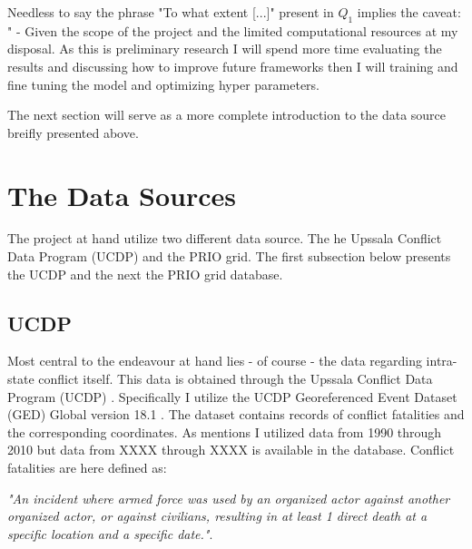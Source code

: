 \documentclass[a4paper]{article}
\begin{document}

Needless to say the phrase "To what extent [...]" present in $Q_1$ implies the caveat: " - Given the scope of the project and the limited computational resources at my disposal. As this is preliminary research I will spend more time evaluating the results and discussing how to improve future frameworks then I will training and fine tuning the model and optimizing hyper parameters.\par 

The next section will serve as a more complete introduction to the data source breifly presented above.\par

\section{The Data Sources} %

The project at hand utilize two different data source. The he Upssala Conflict Data Program (UCDP) \citep{Sundberg_2013, Croicu_Sundberg_2017} and the PRIO grid\citep{Tollefsen_2012}. The first subsection below presents the UCDP and the next the PRIO grid database.\par

\subsection{UCDP}

Most central to the endeavour at hand lies - of course - the data regarding intra-state conflict itself. This data is obtained through the Upssala Conflict Data Program (UCDP) \citep{Sundberg_2013, Croicu_Sundberg_2017}. Specifically I utilize the UCDP Georeferenced Event Dataset (GED) Global version 18.1 \citep{UCDP_2017}. The dataset contains records of conflict fatalities and the corresponding coordinates. As mentions I utilized data from 1990 through 2010 but data from XXXX through XXXX is available in the database. Conflict fatalities are here defined as: 

\begin{displayquote}

\emph{"An incident where armed force was used by an organized actor against another organized actor, or against civilians, resulting in at least 1 direct death at a specific location and a specific date."}\citep[38]{Croicu_Sundberg_2017}.

\end{displayquote}
\end{document}
